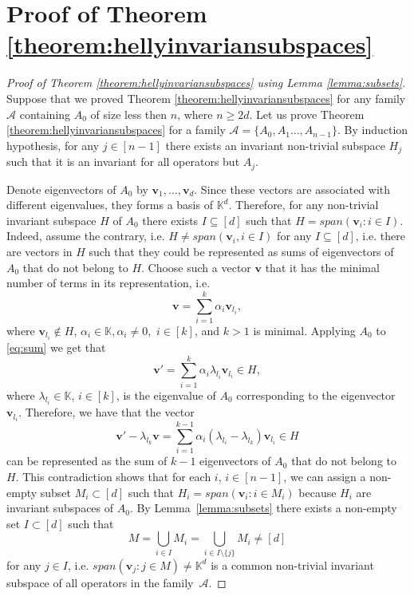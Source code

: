 \documentclass[12pt,nopagetitle]{article}
\theoremstyle{plain}
\theoremstyle{definition}
\begin{document}
\section{Proof of Theorem \ref{theorem:hellyinvariansubspaces}} 
\label{section:prooftheoremhellyinvariantsubspaces}
\begin{proof}[Proof of Theorem \ref{theorem:hellyinvariansubspaces} using Lemma \ref{lemma:subsets}]
Suppose that we proved Theorem \ref{theorem:hellyinvariansubspaces} for any family $\mathcal{A}$ containing $A_0$ of size less then $n$, where $n\geqslant 2d$. Let us prove Theorem \ref{theorem:hellyinvariansubspaces} for a family $\mathcal A=\{A_0,A_1\dots, A_{n-1}\}$. By induction hypothesis, for any $j\in[n-1]$ there exists an invariant non-trivial subspace $H_j$ such that it is an invariant for all operators but $A_j$. 

Denote eigenvectors of $A_0$ by $\mathbf v_1,\dots, \mathbf v_d$. Since these vectors are associated with different eigenvalues, they forms a basis of $\mathbb K^d$. Therefore, for any non-trivial invariant subspace $H$ of $A_0$ there exists $I\subseteq[d]$ such that $H=span(\mathbf v_i: i\in I).$ Indeed, assume the contrary, i.e. $H\ne span(\mathbf v_i, i\in I)$ for any $I\subseteq[d]$, i.e. there are vectors in $H$ such that they could be represented as sums of eigenvectors of $A_0$ that do not belong to $H$. Choose such a vector $\mathbf v$ that it has the minimal number of terms in its representation, i.e. \begin{equation}\label{eq:sum}\mathbf v=\sum_{i=1}^k\alpha_i\mathbf v_{l_i},\end{equation} 
where $\mathbf v_{l_i}\not \in H$, $\alpha_{i}\in\mathbb K, \alpha_i\ne0,$ $i\in[k]$, and $k>1$ is minimal. Applying $A_0$ to \eqref{eq:sum} we get that \begin{equation}\label{eq:sum2}
\mathbf v'=\sum_{i=1}^k \alpha_i\lambda_{l_i} \mathbf v_{l_i}\in H,
\end{equation}
where $\lambda_{l_i}\in \mathbb K$, $i\in [k]$, is the eigenvalue of $A_0$ corresponding to the eigenvector $\mathbf v_{l_i}$. Therefore, we have that the vector 
$$\mathbf v'-\lambda_{l_k} \mathbf v=\sum_{i=1}^{k-1} \alpha_i(\lambda_{l_i}-\lambda_{l_k})\mathbf v_{l_i}\in H$$ 
can be represented as the sum of $k-1$ eigenvectors of $A_0$ that do not belong to $H$. This contradiction shows that for each $i$, $i\in[n-1]$, we can assign a non-empty subset $M_i\subset [d]$ such that $H_i=span(\mathbf v_i:i\in M_i)$ because $H_i$ are invariant subspaces of $A_0$. By Lemma~\ref{lemma:subsets} there exists a non-empty set $I\subset [d]$ such that  $$M=\bigcup_{i\in I}M_i= \bigcup_{i\in I\setminus\{j\}} M_i\ne [d]$$ for any $j\in I$, i.e. $span(\mathbf v_j:j\in M)\ne \mathbb K^d$ is a common non-trivial invariant subspace of all operators in the family~$\mathcal A$.
\end{proof}
\end{document}
